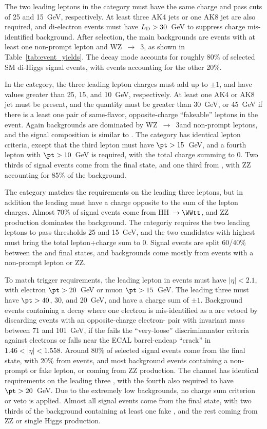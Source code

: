The two leading leptons in the \llss category must have the same charge and pass
\pt cuts of 25 and 15~GeV, respectively.  At least three AK4 jets or one AK8 jet %
are also required, and di-electron events must have $L_\mathrm{D} > 30$~GeV to suppress
charge mis-identified \Zee background.  After selection, the main \llss
backgrounds are events with at least one non-prompt lepton and WZ~$\to$~3\lep, as shown
in Table~\ref{tab:event_yields}. The \WWWW decay mode accounts for roughly 80\% of
selected SM di-Higgs signal events, with \WWtt events accounting for the other 20\%.

In the \lllnot category, the three leading lepton charges must add up to $\pm1$, and
have \pt values greater than 25, 15, and 10~GeV, respectively.  At least one AK4
or AK8 jet must be present, and the \metLD quantity must be greater than 30~GeV,
or 45~GeV if there is a least one pair of same-flavor, opposite-charge ``fakeable''
leptons in the event.  Again backgrounds are dominated by WZ~$\to$~3\lep and non-prompt
leptons, and the signal composition is similar to \llss.
The \llll category has identical lepton criteria, except that the third lepton
must have $\pt > 15$~GeV, and a fourth lepton with $\pt > 10$~GeV is required, with
the total charge summing to 0.  Two thirds of signal events come from the \WWWW final
state, and one third from \WWtt, with ZZ accounting for 85\% of the background.

The \lllt category matches the \lllnot requirements on the leading three
leptons, but in addition the leading \tauh must have a charge opposite to the sum
of the lepton charges.  Almost 70\% of signal events come from HH~$\to \WWtt$,
and ZZ production dominates the background.  The \lltt categoriy requires
the two leading leptons to pass \pt thresholds 25 and 15~GeV, and the two \tauh
candidates with highest \pt must bring the total lepton+\tauh charge sum to 0.
Signal events are split 60/40\% between the \WWtt and \tttt final
states, and backgrounds come mostly from events with a non-prompt lepton or ZZ.

To match trigger requirements, the leading lepton in \lttt events must have
$|\eta| < 2.1$, with electron $\pt > 20$~GeV or muon $\pt > 15$~GeV.  The leading
three \tauh must have $\pt > 40$, 30, and 20~GeV, and have a charge sum of $\pm1$.
Background events containing a \Zee decay where one electron is mis-identified
as a \tauh are vetoed by discarding events with an opposite-charge electron-\tauh
pair with invariant mass between 71 and 101~GeV, if the \tauh fails the ``very-loose''
discriminanator criteria against electrons or falls near the ECAL barrel-endcap
``crack'' in $1.46 < |\eta| < 1.558$.  Around 80\% of selected signal events come
from the \tttt final state, with 20\% from \WWtt events, and most
background events containing a non-prompt or fake lepton, or coming from ZZ production.
The \tttt channel has identical \pt requirements on the leading three \tauh,
with the fourth \tauh also required to have $\pt > 20$~GeV.  Due to the extremely
low backgrounds, no charge sum criterion or \Zee veto is applied.  Almost
all signal events come from the \tttt final state, with two thirds of the
background containing at least one fake \tauh, and the rest coming from ZZ or single
Higgs production.
